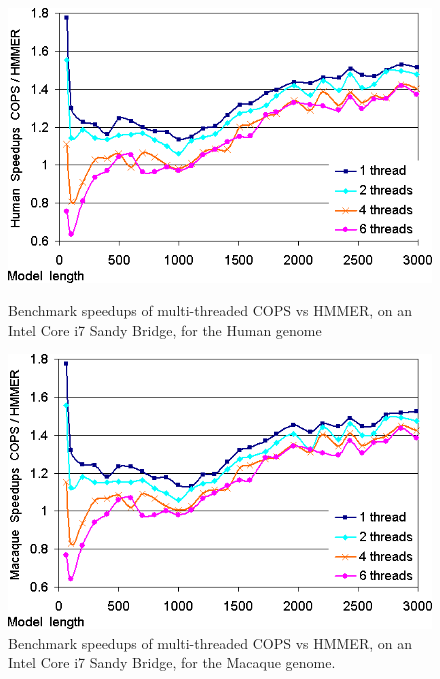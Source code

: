 \begin{figure}[h!]
    \begin{minipage}{0.48\linewidth}
		\centering
		\includegraphics[scale=0.46]{graphics/threads-larissa-speedups-human.png}
		\caption[Speedups of the multi-threaded COPS vs HMMER, Intel Core i7, Human] 
		{Benchmark speedups of multi-threaded COPS vs HMMER, on an Intel Core i7 Sandy Bridge, for the Human genome}
		\label{threads-larissa-speedups-human}
    \end{minipage}
    \hspace{0.04\linewidth}
    \begin{minipage}{0.48\linewidth}
		\centering
		\includegraphics[scale=0.46]{graphics/threads-larissa-speedups-macaque.png}
		\caption[Speedups of the multi-threaded COPS vs HMMER, Intel Core i7, Macaque] 
		{Benchmark speedups of multi-threaded COPS vs HMMER, on an Intel Core i7 Sandy Bridge, for the Macaque genome.}
		\label{threads-larissa-speedups-macaque}
    \end{minipage}
\end{figure} 

